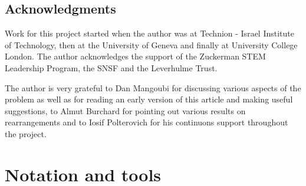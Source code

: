 \documentclass{amsart}
\begin{document}
\subsection{Acknowledgments}
Work for this project started when the author was at Technion - Israel Institute of Technology, then at the University of Geneva and finally at University College London. The author acknowledges the support of the Zuckerman STEM Leadership Program, the SNSF and the Leverhulme Trust.

The author is very grateful to Dan Mangoubi for discussing various aspects of the problem as well as for reading an early version of this article and making useful suggestions, to Almut Burchard for  pointing out various results on rearrangements and to Iosif Polterovich for his continuons support throughout the project.

\section{Notation and tools}
\end{document}
